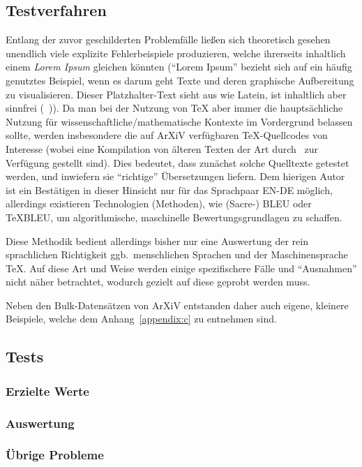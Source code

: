 \subsection{Testverfahren}
Entlang der zuvor geschilderten Problemfälle ließen sich theoretisch gesehen unendlich viele explizite Fehlerbeispiele produzieren, welche ihrerseits inhaltlich einem \textit{Lorem Ipsum} gleichen könnten (\enquote{Lorem Ipsum} bezieht sich auf ein häufig genutztes Beispiel, wenn es darum geht Texte und deren graphische Aufbereitung zu visualisieren. Dieser Platzhalter-Text sieht aus wie Latein, ist inhaltlich aber sinnfrei (~\cite{https://www.loremipsum.de/ueber_lorem_ipsum.html, https://support.microsoft.com/de-de/topic/hinweise-zum-text-lorem-ipsum-dolor-sit-amet-in-der-hilfe-von-microsoft-word-bf3b0a9e-8f6b-c2ab-edd9-41c1f9aa2ea0})). Da man bei der Nutzung von \TeX{} aber immer die hauptsächliche Nutzung für wissenschaftliche/mathematische Kontexte im Vordergrund belassen sollte, werden insbesondere die auf ArXiV verfügbaren \TeX{}-Quellcodes von Interesse (wobei eine Kompilation von älteren Texten der Art durch~\cite{https://info.arxiv.org/help/bulk_data.html} zur Verfügung gestellt sind). Dies bedeutet, dass zunächst solche Quelltexte getestet werden, und inwiefern sie \enquote{richtige} Übersetzungen liefern. Dem hierigen Autor ist ein Bestätigen in dieser Hinsicht nur für das Sprachpaar EN-DE möglich, allerdings existieren Technologien (Methoden), wie (Sacre-) BLEU oder TeXBLEU, um algorithmische, maschinelle Bewertungsgrundlagen zu schaffen.

Diese Methodik bedient allerdings bisher nur eine Auswertung der rein sprachlichen Richtigkeit ggb.\ menschlichen Sprachen und der Maschinensprache \TeX{}. Auf diese Art und Weise werden einige spezifischere Fälle und \enquote{Ausnahmen} nicht näher betrachtet, wodurch gezielt auf diese geprobt werden muss. 

Neben den Bulk-Datensätzen von ArXiV entstanden daher auch eigene, kleinere Beispiele, welche dem Anhang~\ref{appendix:c} zu entnehmen sind.

\subsection{Tests}
\subsubsection{Erzielte Werte}%
\subsubsection{Auswertung}%
\subsubsection{Übrige Probleme}%